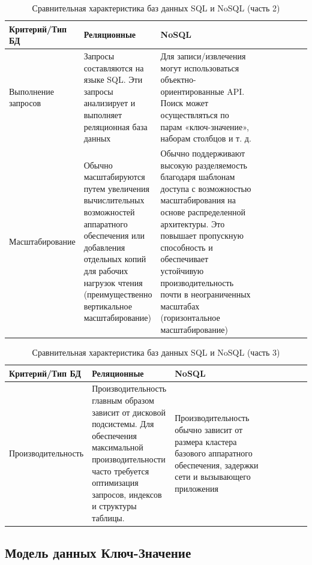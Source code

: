 \begin{table}[h]
\caption{Сравнительная характеристика баз данных SQL и NoSQL (часть 2)}
\begin{center}
\begin{tabular}{|l|p{0.25\linewidth}|p{0.41\linewidth}|p{0.35\linewidth}|}
		\hline
		Критерий/Тип БД & Реляционные & NoSQL \\ [0.5ex] 
		\hline
		Выполнение запросов & Запросы составляются на языке SQL. Эти запросы анализирует и выполняет реляционная база данных & Для записи/извлечения могут использоваться объектно-ориентированные API. Поиск может осуществляться по парам «ключ-значение», наборам столбцов и т. д.\\
		\hline
		Масштабирование & Обычно масштабируются путем увеличения вычислительных возможностей аппаратного обеспечения или добавления отдельных копий для рабочих нагрузок чтения (преимущественно вертикальное масштабирование) & Обычно поддерживают высокую разделяемость благодаря шаблонам доступа с возможностью масштабирования на основе распределенной архитектуры. Это повышает пропускную способность и обеспечивает устойчивую производительность почти в неограниченных масштабах (горизонтальное масштабирование)\\
		\hline
\end{tabular}
\end{center}
\end{table}

\clearpage

\begin{table}[h]
\caption{Сравнительная характеристика баз данных SQL и NoSQL (часть 3)}
\begin{center}
\begin{tabular}{|l|p{0.25\linewidth}|p{0.41\linewidth}|p{0.35\linewidth}|}
		\hline
		Критерий/Тип БД & Реляционные & NoSQL \\ [0.5ex] 
 		\hline
 		Производительность & Производительность главным образом зависит от дисковой подсистемы. Для обеспечения максимальной производительности часто требуется оптимизация запросов, индексов и структуры таблицы. & Производительность обычно зависит от размера кластера базового аппаратного обеспечения, задержки сети и вызывающего приложения\\
 		\hline
\end{tabular}
\end{center}
\end{table}

\clearpage

\subsection{Модель данных Ключ-Значение}

